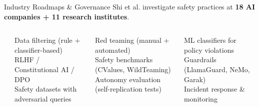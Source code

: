 \begin{frame}{Industry Roadmaps \& Governance}
  {\footnotesize Shi et al. investigate safety practices at
    \textbf{18 AI companies + 11 research institutes}.}
  \vspace{0.3em}

  \begin{columns}[T]
    {\small\bfseries{}}
    \begin{tcolorbox}[enhanced, colback=UCRlgray, colframe=UCRmgray,
        sharp corners, borderline west={3pt}{0pt}{UCRnavy},
        fonttitle=\bfseries\scriptsize\color{UCRnavy},
        title=1.\ Training, top=3pt, bottom=3pt]
      \scriptsize
      Data filtering (rule + classifier-based)\\
      RLHF / Constitutional AI / DPO\\
      Safety datasets with adversarial queries
    \end{tcolorbox}\vspace{2pt}
    \begin{tcolorbox}[enhanced, colback=UCRlgray, colframe=UCRmgray,
        sharp corners, borderline west={3pt}{0pt}{UCRnavy},
        fonttitle=\bfseries\scriptsize\color{UCRnavy},
        title=2.\ Evaluation, top=3pt, bottom=3pt]
      \scriptsize
      Red teaming (manual + automated)\\
      Safety benchmarks (CValues, WildTeaming)\\
      Autonomy evaluation (self-replication tests)
    \end{tcolorbox}\vspace{2pt}
    \begin{tcolorbox}[enhanced, colback=UCRlgray, colframe=UCRmgray,
        sharp corners, borderline west={3pt}{0pt}{UCRnavy},
        fonttitle=\bfseries\scriptsize\color{UCRnavy},
        title=3.\ Deployment, top=3pt, bottom=3pt]
      \scriptsize
      ML classifiers for policy violations\\
      Guardrails (LlamaGuard, NeMo, Garak)\\
      Incident response \& monitoring
    \end{tcolorbox}


\end{columns}
\end{frame}
